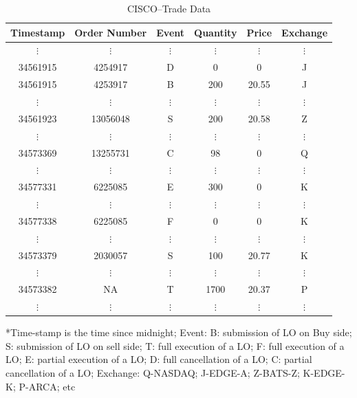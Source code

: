\begin{table}[!ht]
   \centering
   \caption{CISCO--Trade Data\label{tab:CISCO}}
   \begin{tabular}{cccccc} 
	Timestamp & Order Number & Event & Quantity & Price & Exchange \\ \hline
	$\vdots$ & $\vdots$ & $\vdots$ & $\vdots$ & $\vdots$ & $\vdots$ \\
	34561915 & 4254917 & D & 0 & 0 & J \\
	34561915 & 4253917 & B & 200 & 20.55 & J \\
	$\vdots$ & $\vdots$ & $\vdots$ & $\vdots$ & $\vdots$ & $\vdots$ \\
	34561923 & 13056048 & S & 200 & 20.58 & Z \\
	$\vdots$ & $\vdots$ & $\vdots$ & $\vdots$ & $\vdots$ & $\vdots$ \\
	34573369 & 13255731 & C & 98 & 0 & Q \\
	$\vdots$ & $\vdots$ & $\vdots$ & $\vdots$ & $\vdots$ & $\vdots$ \\
	34577331 & 6225085 & E & 300 & 0 & K \\
	$\vdots$ & $\vdots$ & $\vdots$ & $\vdots$ & $\vdots$ & $\vdots$ \\
	34577338 & 6225085 & F & 0 & 0 & K \\
	$\vdots$ & $\vdots$ & $\vdots$ & $\vdots$ & $\vdots$ & $\vdots$ \\
	34573379 & 2030057 & S & 100 & 20.77 & K \\
	$\vdots$ & $\vdots$ & $\vdots$ & $\vdots$ & $\vdots$ & $\vdots$ \\
	34573382 & NA & T & 1700 & 20.37 & P \\
	$\vdots$ & $\vdots$ & $\vdots$ & $\vdots$ & $\vdots$ & $\vdots$ 
   \end{tabular}
\begin{minipage}[t]{1\textwidth}
\small{*Time-stamp is the time since midnight; Event: B: submission of LO on Buy side; S: submission of LO on sell side; T: full execution of a LO; F: full execution of a LO; E: partial execution of a LO; D: full cancellation of a LO; C: partial cancellation of a LO; Exchange: Q-NASDAQ; J-EDGE-A; Z-BATS-Z; K-EDGE-K; P-ARCA; etc}
\end{minipage}
\end{table}


